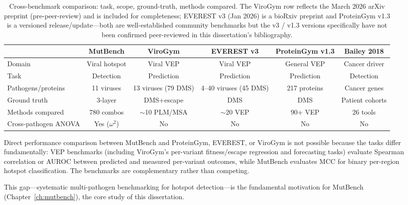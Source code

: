 \begin{table}[htbp]
\centering
\caption[Comparison of MutBench with related benchmarks]{Cross-benchmark comparison: task, scope, ground-truth, methods compared. The ViroGym row reflects the March 2026 arXiv preprint (pre-peer-review) and is included for completeness; EVEREST v3 (Jan 2026) is a bioRxiv preprint and ProteinGym v1.3 is a versioned release/update---both are well-established community benchmarks but the v3 / v1.3 versions specifically have not been confirmed peer-reviewed in this dissertation's bibliography.}
\label{tab:benchmark_comparison}
\footnotesize
\begin{adjustbox}{max width=\textwidth}
\begin{tabular}{lccccc}
\toprule
& \textbf{MutBench} & \textbf{ViroGym} & \textbf{EVEREST v3} & \textbf{ProteinGym v1.3} & \textbf{Bailey 2018} \\
\midrule
Domain & Viral hotspot & Viral VEP & Viral VEP & General VEP & Cancer driver \\
Task & Detection & Prediction & Prediction & Prediction & Detection \\
Pathogens/proteins & 11 viruses & 13 viruses (79 DMS) & 4--40 viruses (45 DMS) & 217 proteins & Cancer genes \\
Ground truth & 3-layer & DMS+escape & DMS & DMS & Patient cohorts \\
Methods compared & 780 combos & $\sim$10 PLM/MSA & $\sim$20 VEP & 90+ VEP & 26 tools \\
Cross-pathogen ANOVA & Yes ($\omega^2$) & No & No & No & No \\
\bottomrule
\end{tabular}
\end{adjustbox}
\par\vspace{0.5em}
\footnotesize Direct performance comparison between MutBench and ProteinGym, EVEREST, or ViroGym is not possible because the tasks differ fundamentally: VEP benchmarks (including ViroGym's per-variant fitness/escape regression and forecasting tasks) evaluate Spearman correlation or AUROC between predicted and measured per-variant outcomes, while MutBench evaluates MCC for binary per-region hotspot classification. The benchmarks are complementary rather than competing.
\end{table}

This gap---systematic multi-pathogen benchmarking for hotspot detection---is the fundamental motivation for MutBench (Chapter~\ref{ch:mutbench}), the core study of this dissertation.



